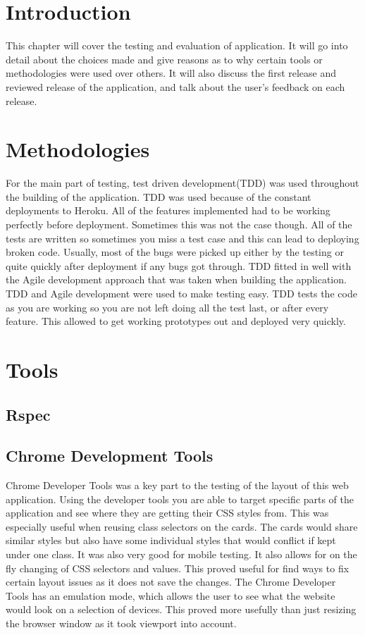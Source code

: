 \section{Introduction}
This chapter will cover the testing and evaluation of application. It will go into detail about the choices made and give reasons as to why certain tools or methodologies were used over others. It will also discuss the first release and reviewed release of the application, and talk about the user's feedback on each release.\\

\section{Methodologies}
For the main part of testing, test driven development(TDD) was used throughout the building of the application. TDD was used because of the constant deployments to Heroku. All of the features implemented had to be working perfectly before deployment. Sometimes this was not the case though. All of the tests are written so sometimes you miss a test case and this can lead to deploying broken code. Usually, most of the bugs were picked up either by the testing or quite quickly after deployment if any bugs got through. TDD fitted in well with the Agile development approach that was taken when building the application. TDD and Agile development were used to make testing easy. TDD tests the code as you are working so you are not left doing all the test last, or after every feature. This allowed to get working prototypes out and deployed very quickly.\\

\section{Tools}
\subsection{Rspec}
\subsection{Chrome Development Tools}
Chrome Developer Tools \citep{cdt:2014} was a key part to the testing of the layout of this web application. Using the developer tools you are able to target specific parts of the application and see where they are getting their CSS styles from. This was especially useful when reusing class selectors on the cards. The cards would share similar styles but also have some individual styles that would conflict if kept under one class. It was also very good for mobile testing. It also allows for on the fly changing of CSS selectors and values. This proved useful for find ways to fix certain layout issues as it does not save the changes. The Chrome Developer Tools has an emulation mode, which allows the user to see what the website would look on a selection of devices. This proved more usefully than just resizing the browser window as it took viewport into account. \\

